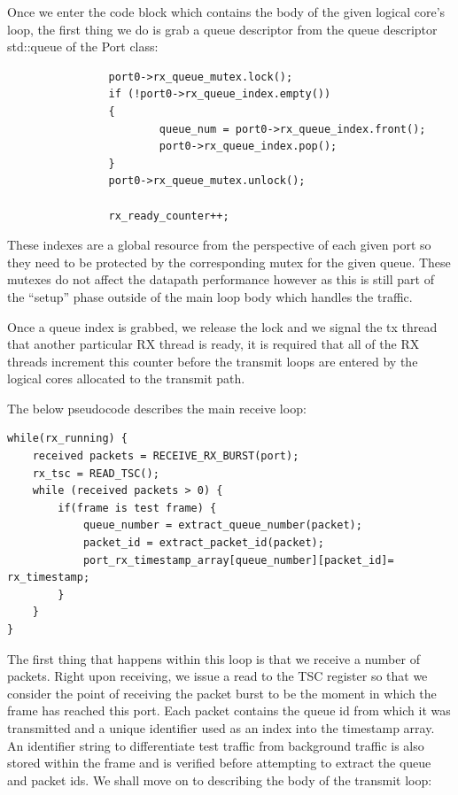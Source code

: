 \documentclass[a4paper,12p,titlepage]{article}
\begin{document}
Once we enter the code block which contains the body of the given logical core’s loop, the first thing we do is grab a queue descriptor from the queue descriptor std::queue of the Port class:

\begin{frame}

\lstset{language=C++,breaklines=true,numbers=left}
\begin{lstlisting}
                port0->rx_queue_mutex.lock();
                if (!port0->rx_queue_index.empty())
                {
                        queue_num = port0->rx_queue_index.front();
                        port0->rx_queue_index.pop();
                }
                port0->rx_queue_mutex.unlock();

                rx_ready_counter++;

\end{lstlisting}
\end{frame}

These indexes are a global resource from the perspective of each given port so they need to be protected by the corresponding mutex for the given queue. These mutexes do not affect the datapath performance however as this is still part of the “setup” phase outside of the main loop body which handles the traffic.

Once a queue index is grabbed, we release the lock and we signal the tx thread that another particular RX thread is ready, it is required that all of the RX threads increment this counter before the transmit loops are entered by the logical cores allocated to the transmit path.

The below pseudocode describes the main receive loop:

\begin{frame}

\lstset{language=C++,breaklines=true,numbers=left}
\begin{lstlisting}
while(rx_running) {
	received packets = RECEIVE_RX_BURST(port);
	rx_tsc = READ_TSC();
	while (received packets > 0) {
		if(frame is test frame) {
			queue_number = extract_queue_number(packet);
			packet_id = extract_packet_id(packet);
			port_rx_timestamp_array[queue_number][packet_id]= rx_timestamp;
		}
	}
}
\end{lstlisting}
\end{frame}

The first thing that happens within this loop is that we receive a number of packets. Right upon receiving, we issue a read to the TSC register so that we consider the point of receiving the packet burst to be the moment in which the frame has reached this port. Each packet contains the queue id from which it was transmitted and a unique identifier used as an index into the timestamp array. An identifier string to differentiate test traffic from background traffic is also stored within the frame and is verified before attempting to extract the queue and packet ids.
	We shall move on to describing the body of the transmit loop:
\end{document}
